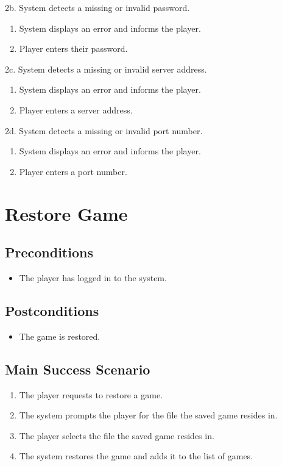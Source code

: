 2b. System detects a missing or invalid password.
\begin{enumerate}
	\item System displays an error and informs the player.
	\item Player enters their password.
\end{enumerate}

2c. System detects a missing or invalid server address.
\begin{enumerate}
	\item System displays an error and informs the player.
	\item Player enters a server address.
\end{enumerate}

2d. System detects a missing or invalid port number.
\begin{enumerate}
	\item System displays an error and informs the player.
	\item Player enters a port number.
\end{enumerate}

\section{Restore Game}

\subsection{Preconditions}
\begin{itemize}
	\item The player has logged in to the system.
\end{itemize}

\subsection{Postconditions}
\begin{itemize}
	\item The game is restored.
\end{itemize}

\subsection{Main Success Scenario}
\begin{enumerate}
	\item The player requests to restore a game.
	\item The system prompts the player for the file the saved game resides in.
	\item The player selects the file the saved game resides in.
	\item The system restores the game and adds it to the list of games.
\end{enumerate}

